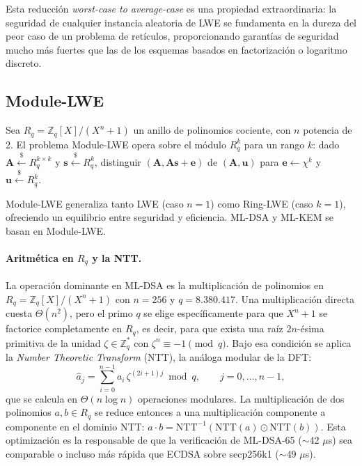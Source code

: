 Esta reducción \emph{worst-case to average-case} es una propiedad extraordinaria: la seguridad de cualquier instancia aleatoria de LWE se fundamenta en la dureza del peor caso de un problema de retículos, proporcionando garantías de seguridad mucho más fuertes que las de los esquemas basados en factorización o logaritmo discreto.

\subsection{Module-LWE}

\begin{definicion}
Sea $R_q = \mathbb{Z}_q[X]/(X^n + 1)$ un anillo de polinomios cociente, con $n$ potencia de 2. El problema Module-LWE opera sobre el módulo $R_q^k$ para un rango $k$: dado $\mathbf{A} \xleftarrow{\$} R_q^{k \times k}$ y $\mathbf{s} \xleftarrow{\$} R_q^k$, distinguir $(\mathbf{A}, \mathbf{A}\mathbf{s} + \mathbf{e})$ de $(\mathbf{A}, \mathbf{u})$ para $\mathbf{e} \leftarrow \chi^k$ y $\mathbf{u} \xleftarrow{\$} R_q^k$.
\end{definicion}

Module-LWE generaliza tanto LWE (caso $n = 1$) como Ring-LWE (caso $k = 1$), ofreciendo un equilibrio entre seguridad y eficiencia. ML-DSA y ML-KEM se basan en Module-LWE.

\paragraph{Aritmética en $R_q$ y la NTT.} La operación dominante en ML-DSA es la multiplicación de polinomios en $R_q = \mathbb{Z}_q[X]/(X^n+1)$ con $n=256$ y $q = 8.380.417$. Una multiplicación directa cuesta $\Theta(n^2)$, pero el primo $q$ se elige específicamente para que $X^n + 1$ se factorice completamente en $R_q$, es decir, para que exista una raíz $2n$-ésima primitiva de la unidad $\zeta \in \mathbb{Z}_q^*$ con $\zeta^{n} \equiv -1 \pmod{q}$. Bajo esa condición se aplica la \emph{Number Theoretic Transform} (NTT), la análoga modular de la DFT:
\begin{equation}
  \hat{a}_j = \sum_{i=0}^{n-1} a_i \, \zeta^{(2i+1)j} \bmod q, \qquad j = 0, \ldots, n-1,
  \label{eq:ntt}
\end{equation}
que se calcula en $\Theta(n \log n)$ operaciones modulares. La multiplicación de dos polinomios $a, b \in R_q$ se reduce entonces a una multiplicación componente a componente en el dominio NTT: $a \cdot b = \text{NTT}^{-1}(\text{NTT}(a) \odot \text{NTT}(b))$. Esta optimización es la responsable de que la verificación de ML-DSA-65 ($\sim$42 $\mu$s) sea comparable o incluso más rápida que ECDSA sobre secp256k1 ($\sim$49 $\mu$s).

